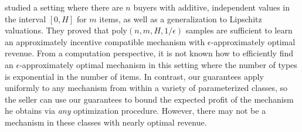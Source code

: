 \citet{Gonczarowski18:Sample} studied a setting where there are $n$ buyers with additive, independent values in the interval $[0,H]$ for $m$ items, as well as a generalization to Lipschitz valuations. They proved that poly$(n, m, H, 1/\epsilon)$ samples are sufficient to learn an approximately incentive compatible mechanism with $\epsilon$-approximately optimal revenue. From a computation perspective, it is not known how to efficiently find an $\epsilon$-approximately optimal mechanism in this setting where the number of types is exponential in the number of items.
In contrast, our guarantees apply uniformly to any mechanism from within a variety of parameterized classes, so the seller can use our guarantees to bound the expected profit of the mechanism he obtains via \emph{any} optimization procedure.
However, there may not be a mechanism in these classes with nearly optimal revenue.